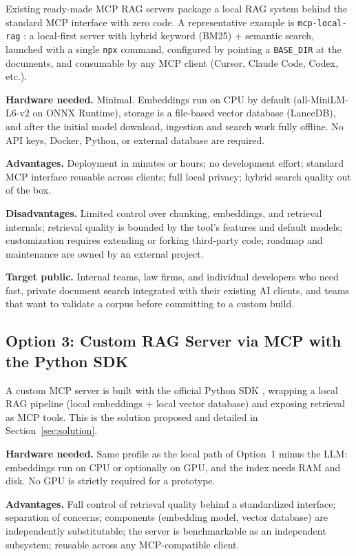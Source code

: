 \documentclass[11pt,a4paper]{article}
\begin{document}
Existing ready-made MCP RAG servers package a local RAG system behind the
standard MCP interface with zero code. A representative example is
\texttt{mcp-local-rag} \cite{mcp-local-rag}: a local-first server with hybrid
keyword (BM25) + semantic search, launched with a single \texttt{npx}
command, configured by pointing a \texttt{BASE\_DIR} at the documents, and
consumable by any MCP client (Cursor, Claude Code, Codex, etc.).

\textbf{Hardware needed.} Minimal. Embeddings run on CPU by default
(all-MiniLM-L6-v2 on ONNX Runtime), storage is a file-based vector database
(LanceDB), and after the initial model download, ingestion and search work
fully offline. No API keys, Docker, Python, or external database are
required.

\textbf{Advantages.} Deployment in minutes or hours; no development effort;
standard MCP interface reusable across clients; full local privacy; hybrid
search quality out of the box.

\textbf{Disadvantages.} Limited control over chunking, embeddings, and
retrieval internals; retrieval quality is bounded by the tool's features and
default models; customization requires extending or forking third-party code;
roadmap and maintenance are owned by an external project.

\textbf{Target public.} Internal teams, law firms, and individual developers
who need fast, private document search integrated with their existing AI
clients, and teams that want to validate a corpus before committing to a
custom build.

\subsection{Option 3: Custom RAG Server via MCP with the Python SDK}

A custom MCP server is built with the official Python SDK \cite{mcp-sdk},
wrapping a local RAG pipeline (local embeddings + local vector database) and
exposing retrieval as MCP tools. This is the solution proposed and detailed
in Section~\ref{sec:solution}.

\textbf{Hardware needed.} Same profile as the local path of Option~1 minus
the LLM: embeddings run on CPU or optionally on GPU, and the index needs RAM
and disk. No GPU is strictly required for a prototype.

\textbf{Advantages.} Full control of retrieval quality behind a standardized
interface; separation of concerns; components (embedding model, vector
database) are independently substitutable; the server is benchmarkable as an
independent subsystem; reusable across any MCP-compatible client.
\end{document}
